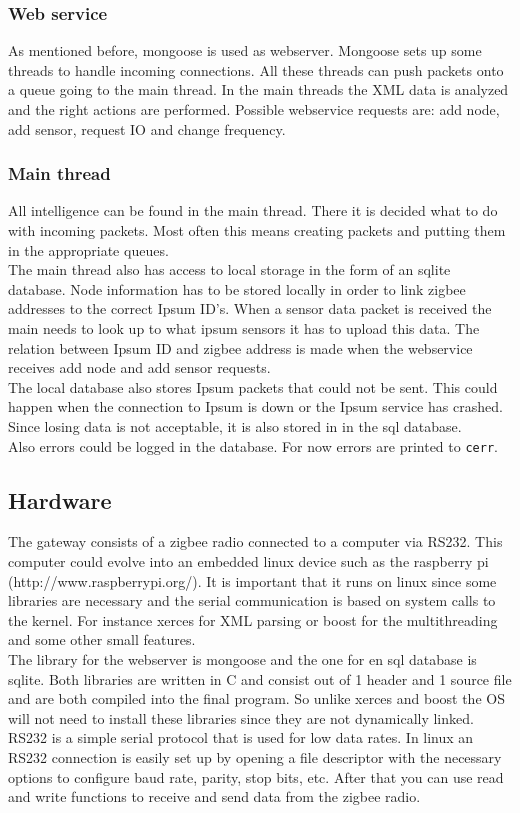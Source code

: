 \subsubsection{Web service}
As mentioned before, mongoose is used as webserver. Mongoose sets up some threads to handle incoming connections. All these threads can push packets onto a queue going to the main thread. In the main threads the XML data is analyzed and the right actions are performed. Possible webservice requests are: add node, add sensor, request IO and change frequency.
\subsubsection{Main thread}
All intelligence can be found in the main thread. There it is decided what to do with incoming packets. Most often this means creating packets and putting them in the appropriate queues. \\
The main thread also has access to local storage in the form of an sqlite database. Node information has to be stored locally in order to link zigbee addresses to the correct Ipsum ID’s. When a sensor data packet is received the main needs to look up to what ipsum sensors it has to upload this data. The relation between Ipsum ID and zigbee address is made when the webservice receives add node and add sensor requests.\\
The local database also stores Ipsum packets that could not be sent. This could happen when the connection to Ipsum is down or the Ipsum service has crashed. Since losing data is not acceptable, it is also stored in in the sql database.\\
Also errors could be logged in the database. For now errors are printed to \verb+cerr+. 
\subsection{Hardware}
The gateway consists of a zigbee radio connected to a computer via RS232. This computer could evolve into an embedded linux device such as the raspberry pi (http://www.raspberrypi.org/). It is important that it runs on linux since some libraries are necessary and the serial communication is based on system calls to the kernel. For instance xerces for XML parsing or boost for the multithreading and some other small features.\\
The library for the webserver is mongoose and the one for en sql database is sqlite. Both libraries are written in C and consist out of 1 header and 1 source file and are both compiled into the final program. So unlike xerces and boost the OS will not need to install these libraries since they are not dynamically linked.\\
RS232 is a simple serial protocol that is used for low data rates. In linux an RS232 connection is easily set up by opening a file descriptor with the necessary options to configure baud rate, parity, stop bits, etc. After that you can use read and write functions to receive and send data from the zigbee radio.

